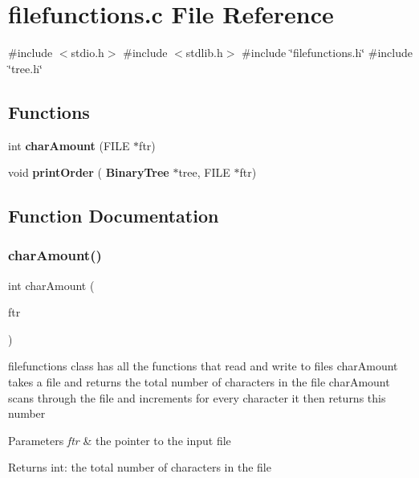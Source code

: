 \section{filefunctions.\+c File Reference}
\label{filefunctions_8c}
{\ttfamily \#include $<$stdio.\+h$>$}\newline
{\ttfamily \#include $<$stdlib.\+h$>$}\newline
{\ttfamily \#include \char`\"{}filefunctions.\+h\char`\"{}}\newline
{\ttfamily \#include \char`\"{}tree.\+h\char`\"{}}\newline
\subsection*{Functions}
\begin{DoxyCompactItemize}
\item 
int \textbf{ char\+Amount} (F\+I\+LE $\ast$ftr)
\item 
void \textbf{ print\+Order} (\textbf{ Binary\+Tree} $\ast$tree, F\+I\+LE $\ast$ftr)
\end{DoxyCompactItemize}


\subsection{Function Documentation}
\mbox{\label{filefunctions_8c_a16c6f6d73a5c0151cde8bd3e3b286107}} 
\subsubsection{char\+Amount()}
{\footnotesize\ttfamily int char\+Amount (\begin{DoxyParamCaption}\item[{F\+I\+LE $\ast$}]{ftr }\end{DoxyParamCaption})}

filefunctions class has all the functions that read and write to files char\+Amount takes a file and returns the total number of characters in the file char\+Amount scans through the file and increments for every character it then returns this number 
\begin{DoxyParams}{Parameters}
{\em ftr} & the pointer to the input file \\
\hline
\end{DoxyParams}
\begin{DoxyReturn}{Returns}
int\+: the total number of characters in the file 
\end{DoxyReturn}
\mbox{\label{filefunctions_8c_a62bab4415030e8ef472fe7a8eee9feef}} 

